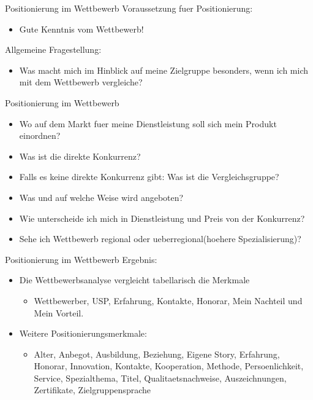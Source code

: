 
\begin{frame}{Positionierung im Wettbewerb}
  Voraussetzung fuer Positionierung:
  \begin{itemize}
  \item Gute Kenntnis vom Wettbewerb!
  \end{itemize}
  Allgemeine Fragestellung:
  \begin{itemize}
    \item Was macht mich im Hinblick auf meine Zielgruppe besonders, wenn ich mich mit dem Wettbewerb vergleiche?
  \end{itemize}
  
\end{frame}

\begin{frame}{Positionierung im Wettbewerb}
  \begin{itemize}
  \item Wo auf dem Markt fuer meine Dienstleistung soll sich mein Produkt einordnen?
  \item Was ist die direkte Konkurrenz?
  \item Falls es keine direkte Konkurrenz gibt: Was ist die Vergleichsgruppe?
  \item Was und auf welche Weise wird angeboten?
  \item Wie unterscheide ich mich in Dienstleistung und Preis von der Konkurrenz?
  \item Sehe ich Wettbewerb regional oder ueberregional(hoehere Spezialisierung)?
  \end{itemize}
\end{frame}

\begin{frame}{Positionierung im Wettbewerb}
  Ergebnis:
  \begin{itemize}
  \item Die Wettbewerbsanalyse vergleicht tabellarisch die Merkmale
    \begin{itemize}
    \item Wettbewerber, USP, Erfahrung, Kontakte, Honorar, Mein Nachteil und Mein Vorteil.
    \end{itemize}
  \item Weitere Positionierungsmerkmale:
    \begin{itemize}
    \item Alter, Anbegot, Ausbildung, Beziehung, Eigene Story, Erfahrung, Honorar, Innovation, Kontakte, Kooperation, Methode, Persoenlichkeit, Service, Spezialthema, Titel, Qualitaetsnachweise, Auszeichnungen, Zertifikate, Zielgruppensprache
    \end{itemize}
  \end{itemize}
\end{frame}

